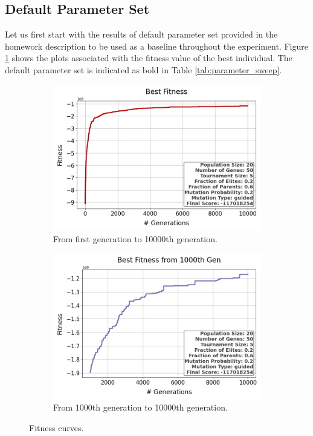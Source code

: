\documentclass{assignment}
\begin{document}
\subsection{Default Parameter Set}
Let us first start with the results of default parameter set provided in the homework description to be used as a baseline throughout the experiment. Figure \ref{fig:default} shows the plots associated with the fitness value of the best individual. The default parameter set is indicated as bold in Table \ref{tab:parameter_sweep}.


\begin{figure}[h!]
    \begin{subfigure}{0.5\textwidth}
        \includegraphics[width=\textwidth]{figures/best_fitness_output_20_50_5_0.2_0.6_0.2_guided.png}
        \caption{From first generation to 10000th generation.}
    \end{subfigure}\hfill
    \begin{subfigure}{0.5\textwidth}
        \includegraphics[width=\textwidth]{figures/best_fitness_1000_output_20_50_5_0.2_0.6_0.2_guided.png}
        \caption{From 1000th generation to 10000th generation.}
    \end{subfigure}
    \caption{Fitness curves.}
    \label{fig:default}
\end{figure}
\end{document}
